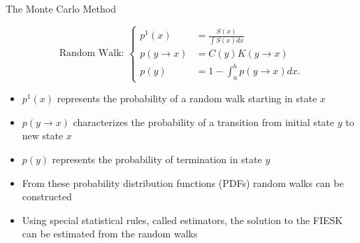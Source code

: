 \documentclass{beamer}
\begin{document}
\begin{frame}{The Monte Carlo Method}

  \begin{equation*}
    \text{Random Walk: }
    \begin{cases}
      p^1(x) & = \frac{S(x)}{\int S(x)dx} \\ 
      p(y \to x) & = C(y)K(y \to x)  \\
      p(y) & = 1 - \int_a^b p(y \to x) dx.
    \end{cases}
    \label{eq:mc_random_walk_pdfs}
  \end{equation*}

  \bigskip

  \begin{itemize}
    \item $p^1(x)$ represents the probability of a random walk starting in
      state $x$
      \medskip
    \item $p(y \to x)$ characterizes the probability of a transition from
      initial state $y$ to new state $x$
      \medskip
    \item $p(y)$ represents the probability of termination in state $y$
      \medskip
    \item From these probability distribution functions (PDFs) random walks
      can be constructed
      \medskip
    \item Using special statistical rules, called estimators, the solution to
      the FIESK can be estimated from the random walks
  \end{itemize}

\end{frame}


\end{document}
